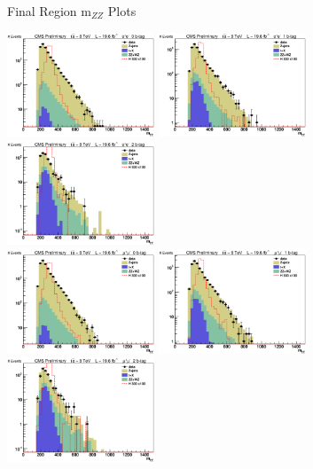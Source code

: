 \begin{frame}{Final Region m$_{ZZ}$ Plots}
\begin{center}
\includegraphics[width=0.33\textwidth]{images/final/0/el/mZZ_signal_log.eps}
\includegraphics[width=0.33\textwidth]{images/final/1/el/mZZ_signal_log.eps}
\includegraphics[width=0.33\textwidth]{images/final/2/el/mZZ_signal_log.eps}\\
\includegraphics[width=0.33\textwidth]{images/final/0/mu/mZZ_signal_log.eps}
\includegraphics[width=0.33\textwidth]{images/final/1/mu/mZZ_signal_log.eps}
\includegraphics[width=0.33\textwidth]{images/final/2/mu/mZZ_signal_log.eps}
\end{center}
\end{frame}



